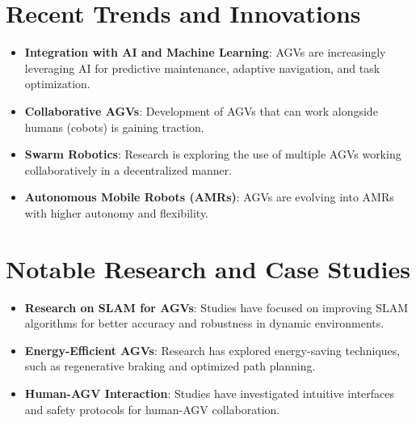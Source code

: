 \documentclass[main]{subfiles}
\begin{document}
\section{Recent Trends and Innovations}
\begin{itemize}
    \item \textbf{Integration with AI and Machine Learning}: AGVs are increasingly leveraging AI for predictive maintenance, adaptive navigation, and task optimization.
    \item \textbf{Collaborative AGVs}: Development of AGVs that can work alongside humans (cobots) is gaining traction.
    \item \textbf{Swarm Robotics}: Research is exploring the use of multiple AGVs working collaboratively in a decentralized manner.
    \item \textbf{Autonomous Mobile Robots (AMRs)}: AGVs are evolving into AMRs with higher autonomy and flexibility.
\end{itemize}

\section{Notable Research and Case Studies}
\begin{itemize}
    \item \textbf{Research on SLAM for AGVs}: Studies have focused on improving SLAM algorithms for better accuracy and robustness in dynamic environments.
    \item \textbf{Energy-Efficient AGVs}: Research has explored energy-saving techniques, such as regenerative braking and optimized path planning.
    \item \textbf{Human-AGV Interaction}: Studies have investigated intuitive interfaces and safety protocols for human-AGV collaboration.
\end{itemize}

\end{document}
